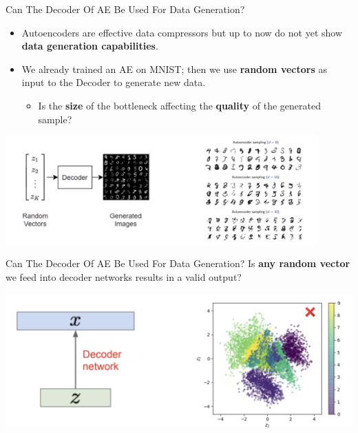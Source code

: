 \documentclass[serif, aspectratio=169]{beamer}
\begin{document}
\begin{frame}{Can The Decoder Of AE Be Used For Data Generation?}
    \small
    \begin{itemize}
        \item Autoencoders are effective data compressors but up to now do not yet show \textbf{data generation capabilities}.
        \item We already trained an AE on MNIST; then we use \textbf{random vectors} as input to the Decoder to generate new data.
        \begin{itemize}
            \item Is the \textbf{size} of the bottleneck affecting the \textbf{quality} of the generated sample?
        \end{itemize}
    \end{itemize}
    
    
    \begin{center}
        \includegraphics[width=0.9\textwidth]{pic/AE for data generation1.png}
    \end{center}
\end{frame}


\begin{frame}{Can The Decoder Of AE Be Used For Data Generation?}
    Is \textbf{\textcolor{deepred}{any random vector}} we feed into decoder networks results in a valid output?
    \vspace{0.5cm}
    
    \begin{center}
        \includegraphics[width=\textwidth]{pic/AE for data generation2.png}
    \end{center}
\end{frame}
\end{document}
